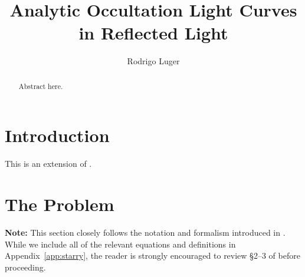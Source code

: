 \documentclass[modern]{aastex62}
\begin{document}
\title{Analytic Occultation Light Curves in Reflected Light}

\author[0000-0002-0296-3826]{Rodrigo Luger}
%

\begin{abstract}
    Abstract here.
    \href{https://github.com/rodluger/starrynight}{\color{linkcolor}\faGithub}
\end{abstract}

%
\section{Introduction}
\label{sec:intro}
%
This is an extension of \citet{Luger2019}.

%
\section{The Problem}
\label{sec:the-problem}
%
\textbf{Note:}
This section closely follows the
notation and formalism introduced in \citet{Luger2019}. While we
include all of the relevant equations and definitions in
Appendix~\ref{app:starry}, the reader is strongly encouraged to
review \S2--3 of \citet{Luger2019} before proceeding.
\end{document}
